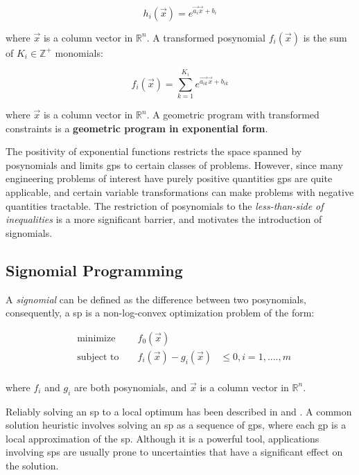 \begin{displaymath}
    h_i(\vec{x}) = e^{\vec{a_i}\vec{x} + b_i}
\end{displaymath}

where $\vec{x}$ is a column vector in $\mathbb{R}^n$.
A transformed posynomial $f_i(\vec{x})$ is the sum of $K_i \in \mathbb{Z}^+$ monomials:

\begin{displaymath}
    f_i(\vec{x}) = \textstyle{\sum_{k=1}^{K_i}}e^{\vec{a_{ik}}\vec{x} + b_{ik}}
\end{displaymath}

where $\vec{x}$ is a column vector in $\mathbb{R}^n$.
A geometric program with transformed constraints is a \textbf{geometric program in exponential form}.

The positivity of exponential functions restricts the space spanned by posynomials and limits
\gls{gp}s to certain classes of problems.
However, since many engineering problems of interest have purely positive quantities \gls{gp}s
are quite applicable, and certain variable transformations can make problems with negative quantities tractable.
The restriction of posynomials to the \emph{less-than-side of
inequalities} is a more significant barrier, and motivates the introduction of signomials.

\subsection{Signomial Programming}
A {\em signomial} can be defined as the difference between two posynomials, consequently,
a \gls{sp} is a non-log-convex optimization problem of the form:

\begin{equation}
\begin{aligned}
&\text{minimize } && f_{0}(\vec{x}) \\
&\text{subject to } && f_{i}(\vec{x}) - g_{i}(\vec{x})& \leq 0, i = 1, ...., m \\
\end{aligned}
\end{equation}

where $f_{i}$ and $g_{i}$ are both posynomials, and $\vec{x}$ is a column vector in $\mathbb{R}^n$. 

Reliably solving an \gls{sp} to a local optimum has been described in \cite{Boyd2007} and \cite{Lipp2016}.
A common solution heuristic involves solving an \gls{sp} as a sequence of \gls{gp}s,
where each \gls{gp} is a local approximation of the \gls{sp}.
Although it is a powerful tool, applications involving \gls{sp}s are usually prone
to uncertainties that have a significant effect on the solution.
